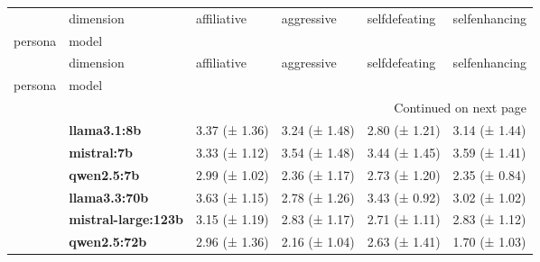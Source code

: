 \begin{longtable}{llllll}
\toprule
 & dimension & affiliative & aggressive & selfdefeating & selfenhancing \\
persona & model &  &  &  &  \\
\midrule
\endfirsthead
\toprule
 & dimension & affiliative & aggressive & selfdefeating & selfenhancing \\
persona & model &  &  &  &  \\
\midrule
\endhead
\midrule
\multicolumn{6}{r}{Continued on next page} \\
\midrule
\endfoot
\bottomrule
\endlastfoot
\multirow[t]{6}{*}{\textbf{base}} & \textbf{llama3.1:8b} & 3.37 (± 1.36) & 3.24 (± 1.48) & 2.80 (± 1.21) & 3.14 (± 1.44) \\
\textbf{} & \textbf{mistral:7b} & 3.33 (± 1.12) & 3.54 (± 1.48) & 3.44 (± 1.45) & 3.59 (± 1.41) \\
\textbf{} & \textbf{qwen2.5:7b} & 2.99 (± 1.02) & 2.36 (± 1.17) & 2.73 (± 1.20) & 2.35 (± 0.84) \\
\textbf{} & \textbf{llama3.3:70b} & 3.63 (± 1.15) & 2.78 (± 1.26) & 3.43 (± 0.92) & 3.02 (± 1.02) \\
\textbf{} & \textbf{mistral-large:123b} & 3.15 (± 1.19) & 2.83 (± 1.17) & 2.71 (± 1.11) & 2.83 (± 1.12) \\
\textbf{} & \textbf{qwen2.5:72b} & 2.96 (± 1.36) & 2.16 (± 1.04) & 2.63 (± 1.41) & 1.70 (± 1.03) \\
\cline{1-6}
\end{longtable}
